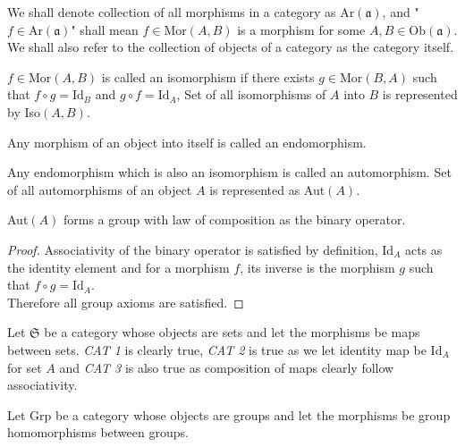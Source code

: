 \documentclass[11pt,a4paper]{colorart}
\def\mab{\mathfrak}
\def\oo{\circ}
\begin{document}
We shall denote collection of all morphisms in a category as $\text{Ar}(\mab{a})$, and "$f \in \text{Ar}(\mab{a})$" shall mean $f \in \text{Mor}(A,B)$ is a morphism for some $A,B \in \text{Ob}(\mab{a})$. We shall also refer to the collection of objects of a category as the category itself.

\begin{definition}[Isomorphism]
	$f \in \text{Mor}(A,B)$ is called an isomorphism if there exists $g \in \text{Mor}(B,A)$ such that $f \oo g = \text{Id}_B $ and $g \oo f = \text{Id}_A $, Set of all isomorphisms of $A$ into $B$ is represented by Iso$(A,B)$.
\end{definition}

\begin{definition}[Endomorphism]
Any morphism of an object into itself is called an endomorphism.
\end{definition}

\begin{definition}[Automorphism]
	Any endomorphism which is also an isomorphism is called an automorphism. Set of all automorphisms of an object $A$ is represented as Aut$(A)$.
\end{definition}

\begin{proposition}
	Aut$(A)$ forms a group with law of composition as the binary operator.
\end{proposition}

\begin{proof}
	Associativity of the binary operator is satisfied by definition, Id$_A$ acts as the identity element and for a morphism $f$, its inverse is the morphism $g$ such that $f \oo g = \text{Id}_A$. \\
	Therefore all group axioms are satisfied.
\end{proof}

\begin{example}
	Let $\mab{S}$ be a category whose objects are sets and let the morphisms be maps between sets. \textit{CAT 1} is clearly true, \textit{CAT 2} is true as we let identity map be Id$_A$ for set $A$ and \textit{CAT 3} is also true as composition of maps clearly follow associativity.
\end{example}

\begin{example}
	Let Grp be a category whose objects are groups and let the morphisms be group homomorphisms between groups.
\end{example}
\end{document}
